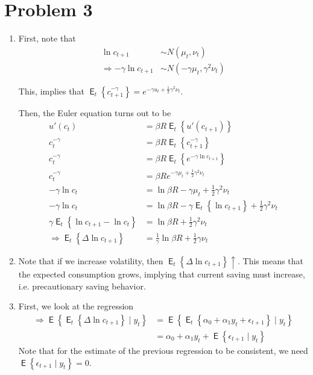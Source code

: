 \documentclass[12pt]{article}
\newcommand{\1}{{\bf 1}} %
\DeclareMathOperator{\E}{\mathsf{E}} %
\newcommand{\Ex}[1]{\E\left\{#1\right\}} %
\newcommand{\cbra}[1]{\left\{ #1 \right\}}
\begin{document}
\section*{Problem 3}
\begin{enumerate}[(1)]
	\item
	
	First, note that
	\begin{align*}
	\ln{c_{t+1}} &\sim N(\mu_t,\nu_t)\\
	\Rightarrow -\gamma\ln{c_{t+1}} &\sim N(-\gamma\mu_t,\gamma^2\nu_t)
	\end{align*}
	
	This, implies that $\E_t \cbra{c_{t+1}^{-\gamma}}=e^{-\gamma u_t + \frac{1}{2}\gamma^2\nu_t}$.
	
	Then, the Euler equation turns out to be
	\begin{align*}
	u'(c_t) & =\beta R \E_t \cbra{u'(c_{t+1})}\\
	c_t^{-\gamma}& =\beta R \E_t \cbra{c_{t+1}^{-\gamma}}\\
	c_t^{-\gamma}& =\beta R \E_t \cbra{e^{-\gamma\ln{c_{t+1}}}}\\
	c_t^{-\gamma}& = \beta Re^{-\gamma \mu_t + \frac{1}{2}\gamma^2\nu_t}\\
	-\gamma\ln{c_t}& =\ln {\beta R }-\gamma \mu_t + \frac{1}{2}\gamma^2\nu_t\\
	-\gamma\ln{c_t}& =\ln {\beta R }-\gamma \E_t\cbra{\ln{c_{t+1}}} + \frac{1}{2}\gamma^2\nu_t\\
	\gamma\E_t\cbra{\ln{c_{t+1}}-\ln{c_t}}& = \ln {\beta R } + \frac{1}{2}\gamma^2\nu_t\\
	\Rightarrow \E_t\cbra{\Delta \ln{c_{t+1}}} &= \frac{1}{\gamma}\ln {\beta R } + \frac{1}{2}\gamma\nu_t
	\end{align*}
	
	\item
	
	Note that if we increase volatility, then $\E_t\cbra{\Delta \ln{c_{t+1}}} \uparrow$. This means that the expected consumption grows, implying that current saving must increase, i.e. precautionary saving behavior.
	
	\item
	First, we look at the regression
			\begin{align*}
	\Rightarrow \Ex{\E_t\cbra{\Delta \ln{c_{t+1}}}\mid y_t} &=  \Ex{\E_t\cbra{ \alpha_0+\alpha_1 y_t + \epsilon_{t+1}}\mid y_t} \\
	&=  \alpha_0+\alpha_1 y_t +\Ex{ \epsilon_{t+1}\mid y_t}
	\end{align*}
	Note that for the estimate of the previous regression to be consistent, we need $\Ex{\epsilon_{t+1}\mid y_t}=0$. 
	

\end{enumerate}
\end{document}
